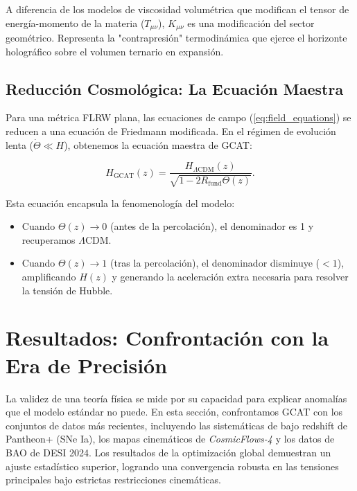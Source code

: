 \documentclass[12pt, a4paper]{article}
\theoremstyle{plain}
\theoremstyle{definition}
\begin{document}
A diferencia de los modelos de viscosidad volumétrica que modifican el tensor de energía-momento de la materia ($T_{\mu\nu}$), $K_{\mu\nu}$ es una modificación del sector geométrico. Representa la "contrapresión" termodinámica que ejerce el horizonte holográfico sobre el volumen ternario en expansión.

\subsection{Reducción Cosmológica: La Ecuación Maestra}

Para una métrica FLRW plana, las ecuaciones de campo (\ref{eq:field_equations}) se reducen a una ecuación de Friedmann modificada. En el régimen de evolución lenta ($\dot{\Theta} \ll H$), obtenemos la ecuación maestra de GCAT:

\begin{equation}
H_{\text{GCAT}}(z) = \frac{H_{\Lambda\text{CDM}}(z)}{\sqrt{1 - 2 R_{\text{fund}} \Theta(z)}}.
\label{eq:master_equation}
\end{equation}

Esta ecuación encapsula la fenomenología del modelo:
\begin{itemize}
    \item Cuando $\Theta(z) \to 0$ (antes de la percolación), el denominador es 1 y recuperamos $\Lambda$CDM.
    \item Cuando $\Theta(z) \to 1$ (tras la percolación), el denominador disminuye ($<1$), amplificando $H(z)$ y generando la aceleración extra necesaria para resolver la tensión de Hubble.
\end{itemize}



\section{Resultados: Confrontación con la Era de Precisión}
\label{sec:resultados}

La validez de una teoría física se mide por su capacidad para explicar anomalías que el modelo estándar no puede. En esta sección, confrontamos GCAT con los conjuntos de datos más recientes, incluyendo las sistemáticas de bajo redshift de Pantheon+ (SNe Ia), los mapas cinemáticos de \textit{CosmicFlows-4} y los datos de BAO de DESI 2024. Los resultados de la optimización global demuestran un ajuste estadístico superior, logrando una convergencia robusta en las tensiones principales bajo estrictas restricciones cinemáticas.
\end{document}
